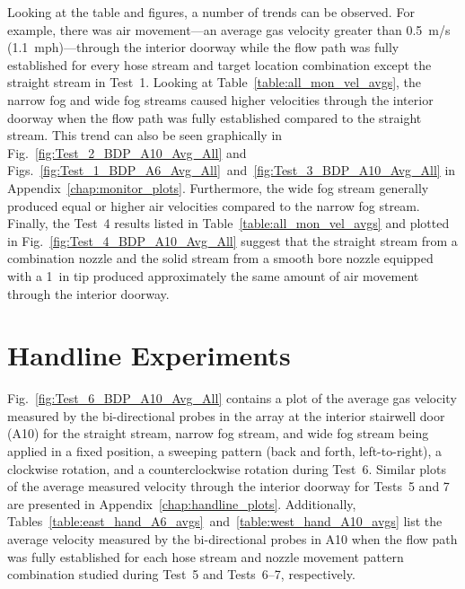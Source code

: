 \documentclass[12pt,oneside]{book}
\begin{document}
Looking at the table and figures, a number of trends can be observed. For example, there was air movement---an average gas velocity greater than 0.5~m/s (1.1~mph)---through the interior doorway while the flow path was fully established for every hose stream and target location combination except the straight stream in Test~1. Looking at Table~\ref{table:all_mon_vel_avgs}, the narrow fog and wide fog streams caused higher velocities through the interior doorway when the flow path was fully established compared to the straight stream. This trend can also be seen graphically in Fig.~\ref{fig:Test_2_BDP_A10_Avg_All} and Figs.~\ref{fig:Test_1_BDP_A6_Avg_All}~and~\ref{fig:Test_3_BDP_A10_Avg_All} in Appendix~\ref{chap:monitor_plots}. Furthermore, the wide fog stream generally produced equal or higher air velocities compared to the narrow fog stream. Finally, the Test~4 results listed in Table~\ref{table:all_mon_vel_avgs} and plotted in Fig.~\ref{fig:Test_4_BDP_A10_Avg_All} suggest that the straight stream from a combination nozzle and the solid stream from a smooth bore nozzle equipped with a 1~in tip produced approximately the same amount of air movement through the interior doorway.
\FloatBarrier

\section{Handline Experiments}
\label{sec:handline_results}
Fig.~\ref{fig:Test_6_BDP_A10_Avg_All} contains a plot of the average gas velocity measured by the bi-directional probes in the array at the interior stairwell door (A10) for the straight stream, narrow fog stream, and wide fog stream being applied in a fixed position, a sweeping pattern (back and forth, left-to-right), a clockwise rotation, and a counterclockwise rotation during Test~6. Similar plots of the average measured velocity through the interior doorway for Tests~5 and 7 are presented in Appendix~\ref{chap:handline_plots}. Additionally, Tables~\ref{table:east_hand_A6_avgs}~and~\ref{table:west_hand_A10_avgs} list the average velocity measured by the bi-directional probes in A10 when the flow path was fully established for each hose stream and nozzle movement pattern combination studied during Test~5 and Tests~6--7, respectively.
\end{document}
